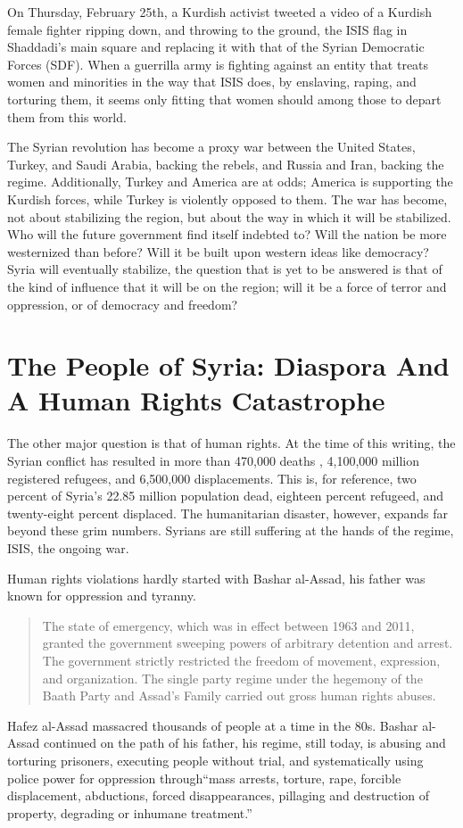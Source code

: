 \documentclass[a4paper,titlepage,12pt]{turabian-researchpaper}
\begin{document}
On Thursday, February 25th, a Kurdish activist tweeted a video of a Kurdish
female fighter ripping down, and throwing to the ground, the ISIS flag in Shaddadi's main square and
replacing it with that of the Syrian Democratic Forces (SDF). \autocite{tweet}
When a guerrilla army is fighting against an entity that treats women and minorities
in the way that ISIS does, by enslaving, raping, and torturing them,
\autocite[1]{isis} it seems
only fitting that women should among those to depart them from this world.

The Syrian revolution has become a proxy war between the United States, Turkey,
and Saudi Arabia, backing the rebels, and Russia and Iran, backing the regime.
Additionally, Turkey and America are at odds; America is supporting the Kurdish
forces, while Turkey is violently opposed to them. The war has become, not
about stabilizing the region, but about the way in which it will be stabilized.
Who will the future government find itself indebted to? Will the nation be more
westernized than before? Will it be built upon western ideas like democracy?
Syria will eventually stabilize, the question that is yet to be answered
is that of the kind of influence that it will be on the region; will it be a
force of terror and oppression, or of democracy and freedom?

\section{The People of Syria: Diaspora And A Human Rights Catastrophe}

The other major question is that of human rights. At the time of this writing,
the Syrian conflict has resulted in more than 470,000 deaths \autocite{death}, 4,100,000 million registered
refugees, and 6,500,000 displacements. This is, for reference, two percent of
Syria's 22.85 million population dead, eighteen percent refugeed, and
twenty-eight percent displaced. The humanitarian disaster, however, expands
far beyond these grim numbers. Syrians are still suffering at the hands of the
regime, ISIS, the ongoing war.
\autocite{cfr}

Human rights violations hardly started with Bashar al-Assad, his father was
known for oppression and tyranny. 
\begin{quote}The state of emergency, which was in effect
between 1963 and 2011, granted the government sweeping powers of arbitrary
detention and arrest. The government strictly restricted the freedom of
movement, expression, and organization. The single party regime under the
hegemony of the Baath Party and Assad’s Family carried out gross human rights
abuses.
\end{quote} 
Hafez al-Assad massacred thousands of people at a time in the 80s.  Bashar
al-Assad continued on the path of his father, his regime, still today, is
abusing and torturing prisoners, executing people without trial, and
systematically using police power for oppression through``mass arrests,
torture, rape, forcible displacement,
abductions, forced disappearances,
pillaging and destruction of property,
degrading or inhumane treatment.''
\end{document}
